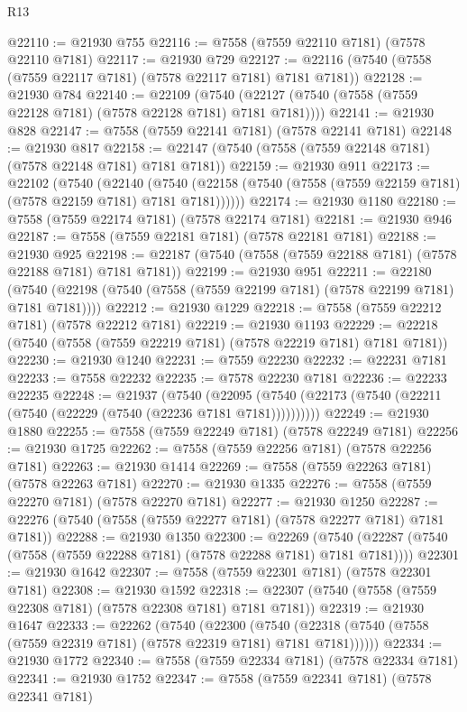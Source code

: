 \begin{lexlean}{R13}
\begin{coremodule}
@22110 := @21930 @755
@22116 := @7558 (@7559 @22110 @7181) (@7578 @22110 @7181)
@22117 := @21930 @729
@22127 := @22116 (@7540 (@7558 (@7559 @22117 @7181) (@7578 @22117 @7181) @7181 @7181))
@22128 := @21930 @784
@22140 := @22109
    (@7540 (@22127 (@7540 (@7558 (@7559 @22128 @7181) (@7578 @22128 @7181) @7181 @7181))))
@22141 := @21930 @828
@22147 := @7558 (@7559 @22141 @7181) (@7578 @22141 @7181)
@22148 := @21930 @817
@22158 := @22147 (@7540 (@7558 (@7559 @22148 @7181) (@7578 @22148 @7181) @7181 @7181))
@22159 := @21930 @911
@22173 := @22102
    (@7540
      (@22140
        (@7540 (@22158 (@7540 (@7558 (@7559 @22159 @7181) (@7578 @22159 @7181) @7181 @7181))))))
@22174 := @21930 @1180
@22180 := @7558 (@7559 @22174 @7181) (@7578 @22174 @7181)
@22181 := @21930 @946
@22187 := @7558 (@7559 @22181 @7181) (@7578 @22181 @7181)
@22188 := @21930 @925
@22198 := @22187 (@7540 (@7558 (@7559 @22188 @7181) (@7578 @22188 @7181) @7181 @7181))
@22199 := @21930 @951
@22211 := @22180
    (@7540 (@22198 (@7540 (@7558 (@7559 @22199 @7181) (@7578 @22199 @7181) @7181 @7181))))
@22212 := @21930 @1229
@22218 := @7558 (@7559 @22212 @7181) (@7578 @22212 @7181)
@22219 := @21930 @1193
@22229 := @22218 (@7540 (@7558 (@7559 @22219 @7181) (@7578 @22219 @7181) @7181 @7181))
@22230 := @21930 @1240
@22231 := @7559 @22230
@22232 := @22231 @7181
@22233 := @7558 @22232
@22235 := @7578 @22230 @7181
@22236 := @22233 @22235
@22248 := @21937
    (@7540 (@22095 (@7540 (@22173 (@7540 (@22211 (@7540 (@22229 (@7540 (@22236 @7181 @7181))))))))))
@22249 := @21930 @1880
@22255 := @7558 (@7559 @22249 @7181) (@7578 @22249 @7181)
@22256 := @21930 @1725
@22262 := @7558 (@7559 @22256 @7181) (@7578 @22256 @7181)
@22263 := @21930 @1414
@22269 := @7558 (@7559 @22263 @7181) (@7578 @22263 @7181)
@22270 := @21930 @1335
@22276 := @7558 (@7559 @22270 @7181) (@7578 @22270 @7181)
@22277 := @21930 @1250
@22287 := @22276 (@7540 (@7558 (@7559 @22277 @7181) (@7578 @22277 @7181) @7181 @7181))
@22288 := @21930 @1350
@22300 := @22269
    (@7540 (@22287 (@7540 (@7558 (@7559 @22288 @7181) (@7578 @22288 @7181) @7181 @7181))))
@22301 := @21930 @1642
@22307 := @7558 (@7559 @22301 @7181) (@7578 @22301 @7181)
@22308 := @21930 @1592
@22318 := @22307 (@7540 (@7558 (@7559 @22308 @7181) (@7578 @22308 @7181) @7181 @7181))
@22319 := @21930 @1647
@22333 := @22262
    (@7540
      (@22300
        (@7540 (@22318 (@7540 (@7558 (@7559 @22319 @7181) (@7578 @22319 @7181) @7181 @7181))))))
@22334 := @21930 @1772
@22340 := @7558 (@7559 @22334 @7181) (@7578 @22334 @7181)
@22341 := @21930 @1752
@22347 := @7558 (@7559 @22341 @7181) (@7578 @22341 @7181)

\end{coremodule}
\end{lexlean}
